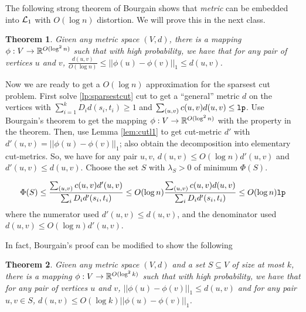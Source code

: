 \documentclass[11pt]{article}
\newtheorem{theorem}{Theorem}
\def\lp{{\tt lp}}
\begin{document}
\noindent
The following strong theorem of Bourgain shows that {\em metric} can be embedded into ${\mathcal L}_1$ with 
$O(\log n)$ distortion. We will prove this in the next class.
\begin{theorem}\label{thm:bourgain}
Given any metric space $(V,d)$, there is a mapping $\phi:V\to {\mathbb R}^{O(\log^2 n)}$ such that 
with high probability, we have that for any pair of vertices $u$ and $v$, $\frac{d(u,v)}{O(\log n)} \le ||\phi(u) - \phi(v)||_1 \le  d(u,v)$.
\end{theorem}
%
\noindent
Now we are ready to get a $O(\log n)$ approximation for the sparsest cut problem. 
First solve \eqref{lp:sparsestcut} cut to get a ``general'' metric $d$ on the vertices with 
$\sum_{i=1}^k D_id(s_i,t_i) \ge 1$ and $\sum_{(u,v)}c(u,v)d(u,v)\le \lp$.
Use Bourgain's theorem  to get the mapping $\phi:V\to {\mathbb R}^{O(\log^2 n)}$ with the property in the theorem.
Then, use Lemma \ref{lem:cutl1} to get cut-metric $d'$ with $d'(u,v) = ||\phi(u)-\phi(v)||_1$;
also obtain the decomposition into elementary cut-metrics. 
So, we have for any pair $u,v$, $d(u,v) \le O(\log n)d'(u,v)$ and $d'(u,v) \le d(u,v)$.
Choose the set $S$ with $\lambda_S > 0$
of minimum $\Phi(S)$.

$$\Phi(S) \le \frac{\sum_{(u,v)} c(u,v)d'(u,v)}{\sum_{i} D_i d'(s_i,t_i)} \le O(\log n) \frac{\sum_{(u,v)} c(u,v)d(u,v)}{\sum_{i} D_i d'(s_i,t_i)} \le O(\log n)\lp $$
where the numerator used $d'(u,v) \le d(u,v)$, and the denominator used $d(u,v) \le O(\log n)d'(u,v)$.

In fact, Bourgain's proof can be modified to show the following

\begin{theorem}\label{thm:bourgain}
Given any metric space $(V,d)$ and a set $S\subseteq V$ of size at most $k$, 
there is a mapping $\phi:V\to {\mathbb R}^{O(\log^2 k)}$ such that 
with high probability, we have that for any pair of vertices $u$ and $v$, $ ||\phi(u) - \phi(v)||_1 \le  d(u,v)$
and for any pair $u,v \in S$, $d(u,v)\le O(\log k) ||\phi(u) - \phi(v)||_1$.
\end{theorem}
\end{document}
